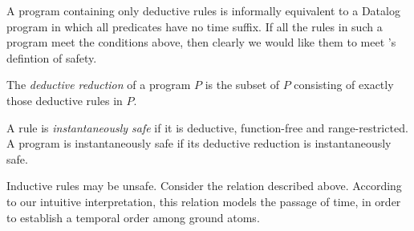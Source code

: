 
  



A \slang program containing only deductive rules is informally equivalent to a
Datalog program in which all predicates have no time suffix.  If all the rules
in such a program meet the conditions above, then clearly we would like them to meet \slang's defintion of safety. 

\begin{definition}
The \emph{deductive reduction} of a \slang program $P$ is the subset of $P$
consisting of exactly those deductive rules in $P$.
\end{definition}

\begin{definition}
A rule is \emph{instantaneously safe} if it is deductive,  function-free and range-restricted.
A \slang program is instantaneously safe if its deductive reduction is instantaneously safe.
\end{definition}

Inductive rules may be unsafe.  Consider the  relation described above.  According to our
intuitive interpretation, this relation models the passage of time, in order to
establish a temporal order among ground atoms. 

